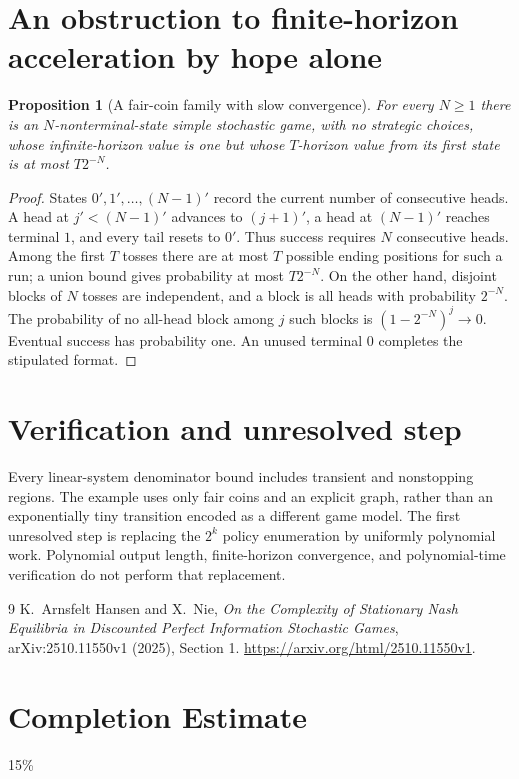 \documentclass[11pt]{article}
\newtheorem{proposition}[theorem]{Proposition}
\theoremstyle{definition}
\begin{document}
\section{An obstruction to finite-horizon acceleration by hope alone}
\begin{proposition}[A fair-coin family with slow convergence]
For every $N\geq1$ there is an $N$-nonterminal-state simple stochastic game,
with no strategic choices, whose infinite-horizon value is one but whose
$T$-horizon value from its first state is at most $T2^{-N}$.
\end{proposition}
\begin{proof}
States $0',1',\ldots,(N-1)'$ record the current number of consecutive heads.
A head at $j'<(N-1)'$ advances to $(j+1)'$, a head at $(N-1)'$ reaches terminal
$1$, and every tail resets to $0'$. Thus success requires $N$ consecutive
heads. Among the first $T$ tosses there are at most $T$ possible ending
positions for such a run; a union bound gives probability at most $T2^{-N}$.
On the other hand, disjoint blocks of $N$ tosses are independent, and a block
is all heads with probability $2^{-N}$. The probability of no all-head block
among $j$ such blocks is $(1-2^{-N})^j\to0$. Eventual success has probability
one. An unused terminal $0$ completes the stipulated format.
\end{proof}

\section{Verification and unresolved step}
Every linear-system denominator bound includes transient and nonstopping
regions. The example uses only fair coins and an explicit graph, rather than
an exponentially tiny transition encoded as a different game model.
The first unresolved step is replacing the $2^k$ policy enumeration by uniformly
polynomial work. Polynomial output length, finite-horizon convergence, and
polynomial-time verification do not perform that replacement.

\begin{thebibliography}{9}
 K.~Arnsfelt Hansen and X.~Nie,
\emph{On the Complexity of Stationary Nash Equilibria in Discounted Perfect
Information Stochastic Games}, arXiv:2510.11550v1 (2025), Section 1.
\url{https://arxiv.org/html/2510.11550v1}.
\end{thebibliography}

\section{Completion Estimate}
15\%
\end{document}
